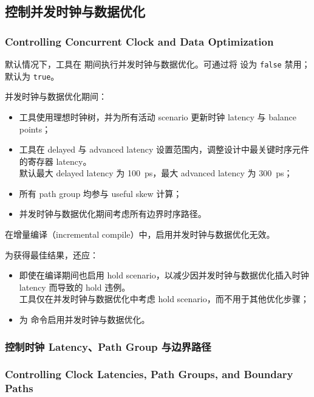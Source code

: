 \subsection{控制并发时钟与数据优化}
\subsubsection*{Controlling Concurrent Clock and Data Optimization}

默认情况下，工具在  期间执行并发时钟与数据优化。可通过将  设为 \texttt{false} 禁用；默认为 \texttt{true}。

并发时钟与数据优化期间：
\begin{itemize}
  \item 工具使用理想时钟树，并为所有活动 scenario 更新时钟 latency 与 balance points；
  \item 工具在 delayed 与 advanced latency 设置范围内，调整设计中最关键时序元件的寄存器 latency。\\
    默认最大 delayed latency 为 100~ps，最大 advanced latency 为 300~ps；
  \item 所有 path group 均参与 useful skew 计算；
  \item 并发时钟与数据优化期间考虑所有边界时序路径。
\end{itemize}

\begin{noteBox}
在增量编译（incremental compile）中，启用并发时钟与数据优化无效。
\end{noteBox}

为获得最佳结果，还应：
\begin{itemize}
  \item 即使在编译期间也启用 hold scenario，以减少因并发时钟与数据优化插入时钟 latency 而导致的 hold 违例。\\
    工具仅在并发时钟与数据优化中考虑 hold scenario，而不用于其他优化步骤；
  \item 为  命令启用并发时钟与数据优化。
\end{itemize}

\subsubsection{控制时钟 Latency、Path Group 与边界路径}
\subsubsection*{Controlling Clock Latencies, Path Groups, and Boundary Paths}

